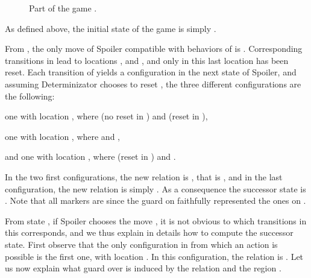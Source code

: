 \documentclass{LMCS}
\theoremstyle{plain}\newtheorem{proposition}[thm]{Proposition}
\begin{document}
\begin{exa}
\begin{figure}[htb]
\begin{center}
{}
\caption{Part of the game .}
\label{fig:ex-game}
\end{center}
\end{figure}

As defined above, the initial state of the game is simply
. 

From , the only move of Spoiler compatible with behaviors of
 is .
Corresponding transitions in   lead to
locations ,  and , and only in this last
location  has been reset.  Each transition of  yields a
configuration in the next state of Spoiler, and assuming
Determinizator chooses to reset , the three different
configurations are the following:
 \begin{iteMize}{}
 \item one with location , where  (no reset in ) and  (reset in ),
 \item one with location , where  and ,
 \item and one with location , where  (reset in ) and
   .
 \end{iteMize} 
 In the two first configurations, the new relation is
 , that is , and in the
 last configuration, the new relation is simply . As a
 consequence the successor state is . Note that all
 markers are  since the guard on  faithfully represented the
 ones on . 

 From state , if Spoiler chooses the move , it is not
 obvious to which transitions in  this corresponds, and we thus
 explain in details how to compute the successor state. 
First observe that the only configuration in  from which an 
 action is possible is the first one, with location . In this
 configuration, the relation is .  Let us now explain what
 guard over  is induced by the relation  and the region
 .
\begin{figure}[htbp]
\begin{center}
\end{center}
\end{figure}
\end{exa}
\end{document}
